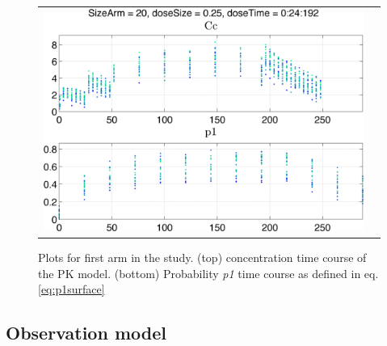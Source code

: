 \begin{figure}[htbp]
\centering
\begin{tabular}{cc}
\includegraphics[width=.6\textwidth]{pics/p1_armA} 
\end{tabular}
\caption{Plots for first arm in the study. (top) concentration time course of the PK model. (bottom) Probability \emph{p1}
time course as defined in eq.\ref{eq:p1surface}}
\label{fig:lambdasurface}
\end{figure}


\subsection{Observation model}


